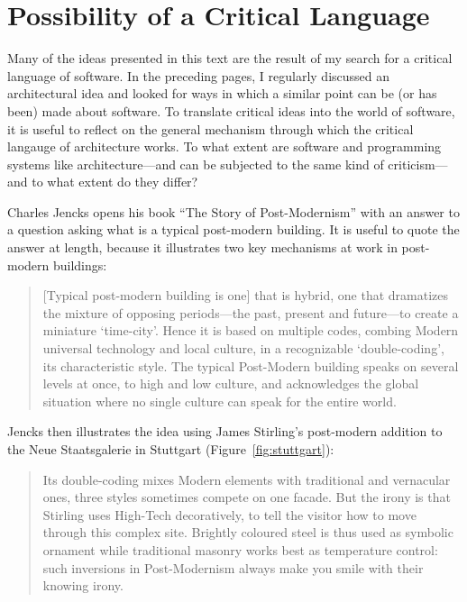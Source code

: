 \section{Possibility of a Critical Language}

Many of the ideas presented in this text are the result of my search for a critical
language of software. In the preceding pages, I regularly discussed an architectural idea and
looked for ways in which a similar point can be (or has been) made about software. To translate
critical ideas into the world of software, it is useful to reflect on the general mechanism
through which the critical langauge of architecture works. To what extent are software and
programming systems like architecture---and can be subjected to the
same kind of criticism---and to what extent do they differ?

Charles Jencks opens his book ``The Story of Post-Modernism'' with an answer to
a question asking what is a typical post-modern building. It is useful to quote the answer at length,
because it illustrates two key mechanisms at work in post-modern buildings:

\begin{quote}
[Typical post-modern building is one]
that is hybrid, one that dramatizes the mixture of opposing periods---the past, present and
future---to create a miniature `time-city'. Hence it is based on multiple codes, combing Modern
universal technology and local culture, in a recognizable `double-coding', its characteristic
style. The typical Post-Modern building speaks on several levels at once, to high and low culture,
and acknowledges the global situation where no single culture can speak for the entire world.
\end{quote}

Jencks then illustrates the idea using James Stirling's post-modern addition to the Neue
Staatsgalerie in Stuttgart (Figure~\ref{fig:stuttgart}):

\begin{quote}
Its double-coding mixes Modern elements with traditional and vernacular ones, three styles
sometimes compete on one facade. But the irony is that Stirling uses High-Tech decoratively,
to tell the visitor how to move through this complex site. Brightly coloured steel is thus used
as symbolic ornament while traditional masonry works best as temperature control:
such inversions in Post-Modernism always make you smile with their knowing irony.
\end{quote}


